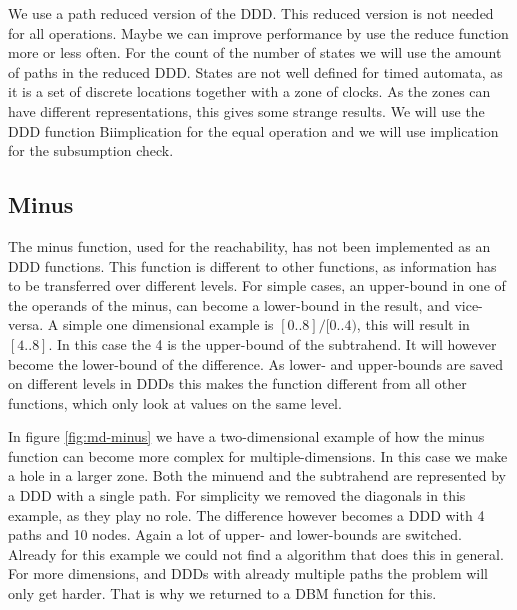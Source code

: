 We use a path reduced version of the DDD. This reduced version is not needed for all operations. Maybe we can improve performance by use the reduce function more or less often. For the count of the number of states we will use the amount of paths in the reduced DDD. States are not well defined for timed automata, as it is a set of discrete locations together with a zone of clocks. As the zones can have different representations, this gives some strange results. We will use the DDD function Biimplication for the equal operation and we will use implication for the subsumption check.

\subsection{Minus}
The minus function, used for the reachability, has not been implemented as an DDD functions. This function is different to other functions, as information has to be transferred over different levels. For simple cases, an upper-bound in one of the operands of the minus, can become a lower-bound in the result, and vice-versa. A simple one dimensional example is $[0..8] / [0..4)$, this will result in $[4..8]$. In this case the 4 is the upper-bound of the subtrahend. It will however become the lower-bound of the difference. As lower- and upper-bounds are saved on different levels in DDDs this makes the function different from all other functions, which only look at values on the same level.

In figure \ref{fig:md-minus} we have a two-dimensional example of how the minus function can become more complex for multiple-dimensions. In this case we make a hole in a larger zone. Both the minuend and the subtrahend are represented by a DDD with a single path. For simplicity we removed the diagonals in this example, as they play no role. The difference however becomes a DDD with 4 paths and 10 nodes. Again a lot of upper- and lower-bounds are switched. Already for this example we could not find a algorithm that does this in general. For more dimensions, and DDDs with already multiple paths the problem will only get harder. That is why we returned to a DBM function for this.



